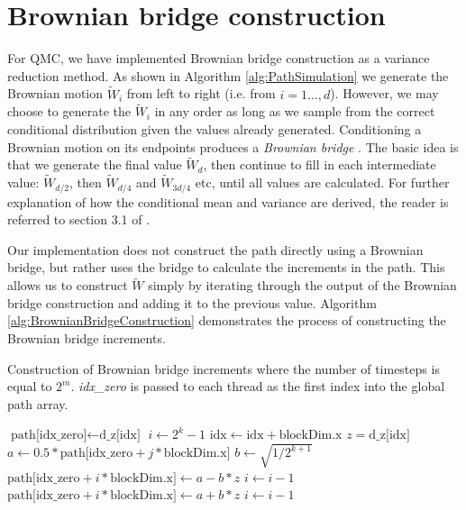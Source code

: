 \section{Brownian bridge construction} \label{sec:BBConstructionResults}
For QMC, we have implemented Brownian bridge construction as a variance reduction method. As shown in Algorithm \ref{alg:PathSimulation} we generate the Brownian motion $\widetilde{W}_i$ from left to right (i.e. from $i=1\dots,d$). However, we may choose to generate the $\widetilde{W}_i$ in any order as long as we sample from the correct conditional distribution given the values already generated. Conditioning a Brownian motion on its endpoints produces a \textit{Brownian bridge} \cite{glasserman2004monte}. The basic idea is that we generate the final value $\widetilde{W}_d$, then continue to fill in each intermediate value: $\widetilde{W}_{d/2}$, then $\widetilde{W}_{d/4}$ and $\widetilde{W}_{3d/4}$ etc, until all values are calculated. For further explanation of how the conditional mean and variance are derived, the reader is referred to section 3.1 of \cite{glasserman2004monte}.

Our implementation does not construct the path directly using a Brownian bridge, but rather uses the bridge to calculate the increments in the path. This allows us to construct $\widetilde{W}$ simply by iterating through the output of the Brownian bridge construction and adding it to the previous value. Algorithm \ref{alg:BrownianBridgeConstruction} demonstrates the process of constructing the Brownian bridge increments.

\begin{algorithm}[hbt!]
\caption{Construction of Brownian bridge increments where the number of timesteps is equal to $2^m$. \textit{idx_zero} is passed to each thread as the first index into the global path array.}\label{alg:BrownianBridgeConstruction}
\begin{algorithmic}[1]
\State $\text{path[idx_zero]} \gets \text{d_z[idx]}$ 
    \State $i \gets 2^k - 1$
        \State $\text{idx} \gets \text{idx} + \text{blockDim.x}$ 
        \State $z = \text{d_z[idx]}$
        \State $a \gets 0.5 * \text{path[idx_zero} + j * \text{blockDim.x]}$
        \State $b \gets \sqrt{1 / 2^{k+1}}$
        \State $\text{path[idx_zero} + i * \text{blockDim.x]} \gets a - b * z$
        \State $i \gets i - 1$
        \State $\text{path[idx_zero} + i * \text{blockDim.x]} \gets a + b * z$
        \State $i \gets i - 1$
    \EndFor
\EndFor
\end{algorithmic}
\end{algorithm}

